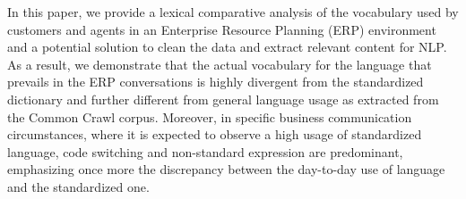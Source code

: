 In this paper, we provide a lexical comparative analysis of the vocabulary used by customers and agents in an Enterprise Resource Planning (ERP) environment and a potential solution to clean the data and extract relevant content for NLP. As a result, we demonstrate that the actual vocabulary for the language that prevails in the ERP conversations is highly divergent from the standardized dictionary and further different from general language usage as extracted from the Common Crawl corpus. Moreover, in specific business communication circumstances, where it is expected to observe a high usage of standardized language, code switching and non-standard expression are predominant, emphasizing once more the discrepancy between the day-to-day use of language and the standardized one.
